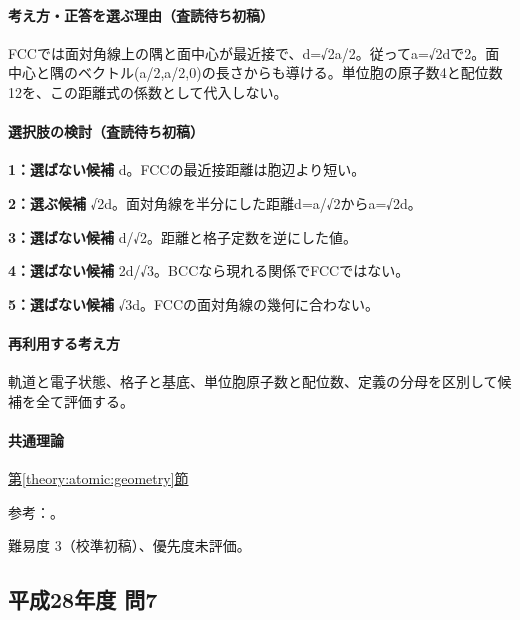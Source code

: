 \paragraph{考え方・正答を選ぶ理由（査読待ち初稿）} FCCでは面対角線上の隅と面中心が最近接で、d=√2a/2。従ってa=√2dで2。面中心と隅のベクトル(a/2,a/2,0)の長さからも導ける。単位胞の原子数4と配位数12を、この距離式の係数として代入しない。

\paragraph{選択肢の検討（査読待ち初稿）}\mbox{}\par

\noindent\textbf{1：選ばない候補} d。FCCの最近接距離は胞辺より短い。\par

\noindent\textbf{2：選ぶ候補} √2d。面対角線を半分にした距離d=\allowbreak{}a/√2からa=√2d。\par

\noindent\textbf{3：選ばない候補} d/√2。距離と格子定数を逆にした値。\par

\noindent\textbf{4：選ばない候補} 2d/√3。BCCなら現れる関係でFCCではない。\par

\noindent\textbf{5：選ばない候補} √3d。FCCの面対角線の幾何に合わない。\par

\paragraph{再利用する考え方} 軌道と電子状態、格子と基底、単位胞原子数と配位数、定義の分母を区別して候補を全て評価する。

\paragraph{共通理論} \hyperref[theory:atomic:geometry]{第\ref*{theory:atomic:geometry}節}

\par 参考：\cite{openstax_crystals}。

\par 難易度 3（校準初稿）、優先度未評価。

\subsection{平成28年度 問7}
\label{q:h28-reg-applied-07}

